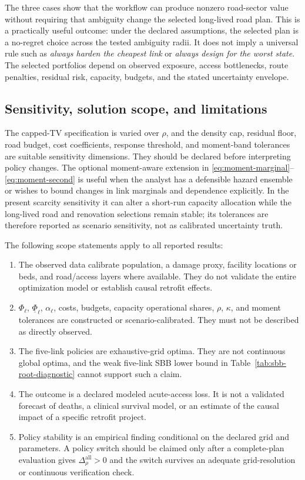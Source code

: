The three cases show that the workflow can produce nonzero road-sector value
without requiring that ambiguity change the selected long-lived road plan.
This is a practically useful outcome: under the declared assumptions, the
selected plan is a no-regret choice across the tested ambiguity radii. It
does not imply a universal rule such as \emph{always harden the cheapest
link} or \emph{always design for the worst state}. The selected portfolios
depend on observed exposure, access bottlenecks, route penalties, residual
risk, capacity, budgets, and the stated uncertainty envelope.

\subsection{Sensitivity, solution scope, and limitations}
\label{sec:results-limitations}

The capped-TV specification is varied over \(\rho\), and the density cap,
residual floor, road budget, cost coefficients, response threshold, and
moment-band tolerances are suitable sensitivity dimensions. They should be
declared before interpreting policy changes. The optional moment-aware
extension in \eqref{eq:moment-marginal}--\eqref{eq:moment-second} is useful
when the analyst has a defensible hazard ensemble or wishes to bound changes
in link marginals and dependence explicitly. In the present scarcity
sensitivity it can alter a short-run capacity allocation while the
long-lived road and renovation selections remain stable; its tolerances are
therefore reported as scenario sensitivity, not as calibrated uncertainty
truth.

The following scope statements apply to all reported results:
\begin{enumerate}
 \item The observed data calibrate population, a damage proxy, facility
       locations or beds, and road/access layers where available. They do
       not validate the entire optimization model or establish causal
       retrofit effects.
 \item \(\Phi_\ell\), \(\underline\Phi_\ell\), \(\alpha_\ell\), costs,
       budgets, capacity operational shares, \(\rho\), \(\kappa\), and
       moment tolerances are constructed or scenario-calibrated. They must
       not be described as directly observed.
 \item The five-link policies are exhaustive-grid optima. They are not
       continuous global optima, and the weak five-link SBB lower bound in
       Table~\ref{tab:sbb-root-diagnostic} cannot support such a claim.
 \item The outcome is a declared modeled acute-access loss. It is not a
       validated forecast of deaths, a clinical survival model, or an
       estimate of the causal impact of a specific retrofit project.
 \item Policy stability is an empirical finding conditional on the declared
       grid and parameters. A policy switch should be claimed only after a
       complete-plan evaluation gives
       \(\Delta_\rho^{\mathrm{all}}>0\) and the switch survives an adequate
       grid-resolution or continuous verification check.
\end{enumerate}


